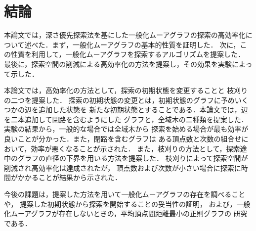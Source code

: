 
\chapter{結論}
本論文では，深さ優先探索法を基にした一般化ムーアグラフの探索の高効率化に
ついて述べた．まず，一般化ムーアグラフの基本的性質を証明した．
次に，この性質を利用して，一般化ムーアグラフを探索するアルゴリズムを提案した．
最後に，探索空間の削減による高効率化の方法を提案し，その効果を実験によって示した．

本論文では，高効率化の方法として，探索の初期状態を変更することと
枝刈りの二つを提案した．
探索の初期状態の変更とは，初期状態のグラフに予めいくつかの辺を追加した状態を
新たな初期状態とすることである．本論文では，辺を二本追加して閉路を含むようにした
グラフと，全域木の二種類を提案した．実験の結果から，一般的な場合では全域木から
探索を始める場合が最も効率が良いことが分かった．また，閉路を含むグラフは
ある頂点数と次数の組合せにおいて，効率が悪くなることが示された．
また，枝刈りの方法として，探索途中のグラフの直径の下界を用いる方法を提案した．
枝刈りによって探索空間が削減され高効率化は達成されたが，
頂点数および次数が小さい場合に探索に時間がかかることが結果から示された．

今後の課題は，提案した方法を用いて一般化ムーアグラフの存在を調べることや，
提案した初期状態から探索を開始することの妥当性の証明，
および，一般化ムーアグラフが存在しないときの，平均頂点間距離最小の正則グラフの
研究である．
